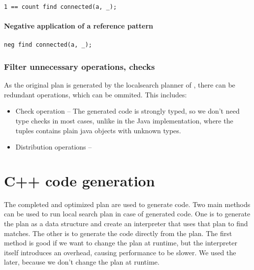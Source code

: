 \begin{lstlisting}[language = vql]
1 == count find connected(a, _);
\end{lstlisting}


\paragraph{Negative application of a reference pattern}

\begin{lstlisting}[language = vql]
neg find connected(a, _);
\end{lstlisting}

\subsubsection{Filter unnecessary operations, checks}
As the original plan is generated by the localsearch planner of \viatra{}, there can be redundant operations, which can be ommited. This includes:

\begin{itemize}
	\item Check operation -- The generated code is strongly typed, so we don't need type checks in most cases, unlike in the Java implementation, where the tuples contains plain java objects with unknown types.
	
	\item Distribution operations -- 
\end{itemize}



\section{C++ code generation}

The completed and optimized plan are used to generate \cpp{} code. 
Two main methods can be used to run local search plan in case of generated code. 
One is to generate the plan as a data structure and create an interpreter that uses that plan to find matches. 
The other is to generate the code directly from the plan. 
The first method is good if we want to change the plan at runtime, but the interpreter itself introduces an overhead, causing performance to be slower.
We used the later, because we don't change the plan at runtime.












